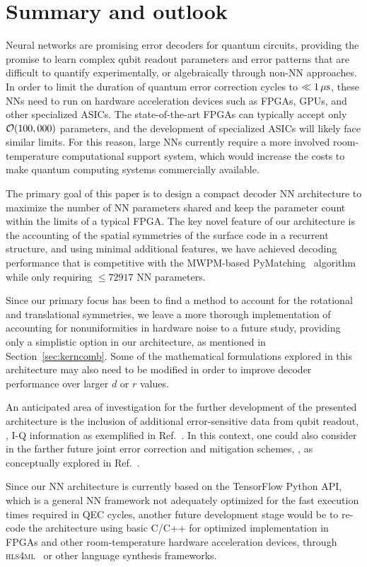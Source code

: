 \section{Summary and outlook}
\label{sec:summary}

Neural networks are promising error decoders for quantum circuits, providing the promise to learn complex qubit readout parameters and error patterns that are difficult to quantify experimentally, or algebraically through non-NN approaches.
In order to limit the duration of quantum error correction cycles to $\ll 1\,\mu\text{s}$, these NNs need to run on hardware acceleration devices such as FPGAs, GPUs, and other specialized ASICs. The state-of-the-art FPGAs can typically accept only $\mathcal{O}(100,000)$ parameters, and the development of specialized ASICs will likely face similar limits. For this reason, large NNs currently require a more involved room-temperature computational support system, which would increase the costs to make quantum computing systems commercially available.

The primary goal of this paper is to design a compact decoder NN architecture to maximize the number of NN parameters shared and keep the parameter count within the limits of a typical FPGA. The key novel feature of our architecture is the accounting of the spatial symmetries of the surface code in a recurrent structure, and using minimal additional features, we have achieved decoding performance that is competitive with the MWPM-based PyMatching~\cite{Higgott:2023} algorithm while only requiring $\leq72917$ NN parameters.

Since our primary focus has been to find a method to account for the rotational and translational symmetries, we leave a more thorough implementation of accounting for nonuniformities in hardware noise to a future study, providing only a simplistic option in our architecture, as mentioned in Section~\ref{sec:kerncomb}. Some of the mathematical formulations explored in this architecture may also need to be modified in order to improve decoder performance over larger $d$ or $r$ values.

An anticipated area of investigation for the further development of the presented architecture is the inclusion of additional error-sensitive data from qubit readout, \eg, I-Q information as exemplified in Ref.~\cite{Bausch:2023jgi}. In this context, one could also consider in the farther future joint error correction and mitigation schemes, \eg, as conceptually explored in Ref.~\cite{Sarica:2023}.

Since our NN architecture is currently based on the TensorFlow Python API, which is a general NN framework not adequately optimized for the fast execution times required in QEC cycles, another future development stage would be to re-code the architecture using basic C/C++ for optimized implementation in FPGAs and other room-temperature hardware acceleration devices, through \textsc{hls4ml}~\cite{hls4ml} or other language synthesis frameworks.
